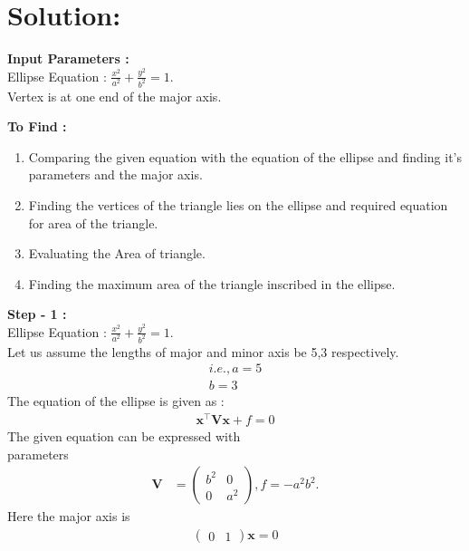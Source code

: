\documentclass[10pt,a4paper]{report}
\newcommand{\myvec}[1]{\ensuremath{\begin{pmatrix}#1\end{pmatrix}}}
\let\vec\mathbf
\begin{document}
\section{Solution: }

\raggedright \textbf{Input Parameters :}\\ \vspace{2mm}
\centering Ellipse Equation : $\frac{x^2}{a^2} + \frac{y^2}{b^2} = 1$. \\ \vspace{1mm}
Vertex is at one end of the major axis.
\vspace{3mm}

\raggedright \textbf{To Find :}\\ \vspace{2mm}
\begin{enumerate}
\item Comparing the given equation with the equation of the ellipse and finding it's parameters and the major axis.
\item Finding the vertices of the triangle lies on the ellipse and required equation for area of the triangle.
\item Evaluating the Area of triangle.
\item Finding the maximum area of the triangle inscribed in the ellipse.
\end{enumerate}

\raggedright \textbf{Step - 1 :}\\ \vspace{2mm}
Ellipse Equation : $\frac{x^2}{a^2} + \frac{y^2}{b^2} = 1$. \\ \vspace{1mm}
Let us assume the lengths of major and minor axis be 5,3 respectively.
\begin{align*}
i.e., a=5 \\
b=3
\end{align*}
The equation of the ellipse is given as :
\begin{align}
\vec{x}^{\top}\vec{V}\vec{x}+f=0
\end{align}
The given equation can be expressed with \\parameters
\begin{align}
	\vec{V} &= \myvec{b^2 & 0\\0 & a^2}, f = -a^2b^2.
	\end{align}
Here the major axis is 
\begin{align}
\myvec{0&1}\vec{x}=0
\end{align}
\end{document}
